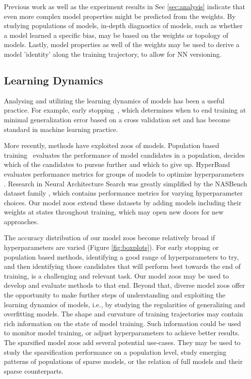 Previous work as well as the experiment results in Sec \ref{sec:analysis} indicate that even more complex model properties might be predicted from the weights. By studying populations of models, in-depth diagnostics of models, such as whether a model learned a specific bias, may be based on the weights or topology of models. 
Lastly, model properties as well of the weights may be used to derive a model 'identity' along the training trajectory, to allow for NN versioning.  



\subsection{Learning Dynamics}
% 
Analysing and utilizing the learning dynamics of models has been a useful practice. 
For example, early stopping~\citep{FinnoffImprovingModelSelection1993}, which determines when to end training at minimal generalization error based on a cross validation set and has become standard in machine learning practice. 

More recently, methods have exploited zoos of models. Population based training~\citep{jaderbergPopulationBasedTraining2017} evaluates the performance of model candidates in a population, decides which of the candidates to pursue further and which to give up. HyperBand evaluates performance metrics for groups of models to optimize hyperparameters \citep{liHyperbandNovelBanditBased2018, liSystemMassivelyParallel2020}.
Research in Neural Architecture Search was greatly simplified by the NASBench dataset family \citep{yingNASBench101ReproducibleNeural2019}, which contains performance metrics for varying hyperparameter choices. Our model zoos extend these datasets by adding models including their weights at states throughout training, which may open new doors for new approaches.

The accuracy distribution of our model zoos become relatively broad if hyperparameters are varied (Figure \ref{fig:boxplots}).
For early stopping or population based methods, identifying a good range of hyperparameters to try, and then identifying those candidates that will perform best towards the end of training, is a challenging and relevant task. 
Our model zoos may be used to develop and evaluate methods to that end.
Beyond that, diverse model zoos offer the opportunity to make further steps of understanding and exploiting the learning dynamics of models, i.e., by studying the regularities of generalizing and overfitting models. 
The shape and curvature of training trajectories may contain rich information on the state of model training.
Such information could be used to monitor model training, or adjust hyperparameters to achieve better results.
The sparsified model zoos add several potential use-cases. They may be used to study the sparsification performance on a population level, study emerging patterns of populations of sparse models, or the relation of full models and their sparse counterparts. 


